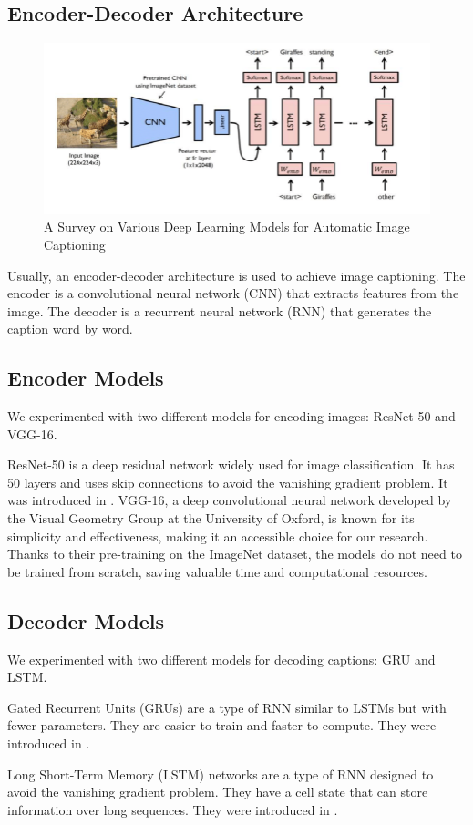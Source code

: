 \documentclass[12pt]{article}
\theoremstyle{plain}
\theoremstyle{definition}
\theoremstyle{remark}
\begin{document}
\subsection{Encoder-Decoder Architecture}
\begin{figure}[H]
    \centering
    \includegraphics[width=.5\textwidth]{res/encoder-decoder.png}
    \caption{A Survey on Various Deep Learning Models for Automatic Image Captioning \cite{gaurav}}
    \label{fig:encoder-decoder}
\end{figure}
Usually, an encoder-decoder architecture is used to achieve image captioning. The encoder is a convolutional neural network (CNN) that extracts features from the image. The decoder is a recurrent neural network (RNN) that generates the caption word by word.

\subsection{Encoder Models}
We experimented with two different models for encoding images: ResNet-50 and VGG-16.
\par ResNet-50 is a deep residual network widely used for image classification. It has 50 layers and uses skip connections to avoid the vanishing gradient problem. It was introduced in \cite{he}.
VGG-16, a deep convolutional neural network developed by the Visual Geometry Group at the University of Oxford, is known for its simplicity and effectiveness, making it an accessible choice for our research.
Thanks to their pre-training on the ImageNet dataset, the models do not need to be trained from scratch, saving valuable time and computational resources.

\subsection{Decoder Models}
We experimented with two different models for decoding captions: GRU and LSTM.
\par Gated Recurrent Units (GRUs) are a type of RNN similar to LSTMs but with fewer parameters. They are easier to train and faster to compute. They were introduced in \cite{cho}.
\par Long Short-Term Memory (LSTM) networks are a type of RNN designed to avoid the vanishing gradient problem. They have a cell state that can store information over long sequences. They were introduced in \cite{hochreiter}.
\end{document}
